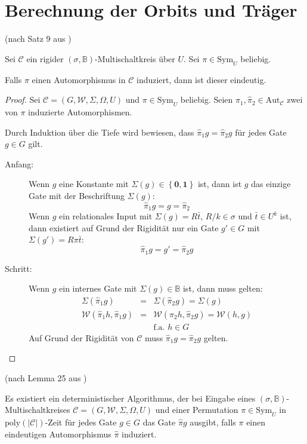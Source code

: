\section{Berechnung der Orbits und Träger}
\begin{prop}
\label{lem:rigide-eindeutig}(nach Satz 9 aus \cite{AD2014})

Sei $\mathcal{C}$ ein rigider $\left(\sigma,\mathbb{B}\right)$-Multischaltkreis
über $U$. Sei $\pi\in\mathrm{Sym}_{U}$ beliebig.

Falls $\pi$ einen Automorphismus in $\mathcal{C}$ induziert, dann
ist dieser eindeutig.
\end{prop}
\begin{proof}
Sei $\mathcal{C}=\left(G,\mathcal{W},\Sigma,\Omega,U\right)$ und
$\pi\in\mathrm{Sym}_{U}$ beliebig. Seien $\hat{\pi}_{1},\hat{\pi}_{2}\in\mathrm{Aut}_{\mathcal{C}}$
zwei von $\pi$ induzierte Automorphismen.

Durch Induktion über die Tiefe wird bewiesen, dass $\hat{\pi}_{1}g=\hat{\pi}_{2}g$
für jedes Gate $g\in G$ gilt.

\begin{description}
\item [{Anfang:}] Wenn $g$ eine Konstante mit $\Sigma\left(g\right)\in\left\{ \mathbf{0},\mathbf{1}\right\} $
ist, dann ist $g$ das einzige Gate mit der Beschriftung $\Sigma\left(g\right)$:
\[
\hat{\pi}_{1}g=g=\hat{\pi}_{2}
\]
Wenn $g$ ein relationales Input mit $\Sigma\left(g\right)=R\bar{t}$,
$R/k\in\sigma$ und $\bar{t}\in U^{k}$ ist, dann existiert auf Grund
der Rigidität nur ein Gate $g'\in G$ mit $\Sigma\left(g'\right)=R\pi\bar{t}$:
\[
\hat{\pi}_{1}g=g'=\hat{\pi}_{2}g
\]
\item [{Schritt:}] Wenn $g$ ein internes Gate mit $\Sigma\left(g\right)\in\mathbb{B}$
ist, dann muss gelten:
\begin{eqnarray*}
\Sigma\left(\hat{\pi}_{1}g\right) & = & \Sigma\left(\hat{\pi}_{2}g\right)=\Sigma\left(g\right)\\
\mathcal{W}\left(\hat{\pi}_{1}h,\hat{\pi}_{1}g\right) & = & \mathcal{W}\left(\hat{\pi}_{2}h,\hat{\pi}_{2}g\right)=\mathcal{W}\left(h,g\right)\\
 &  & \mathrm{f.a.}\,\,h\in G
\end{eqnarray*}
Auf Grund der Rigidität von $\mathcal{C}$ muss $\hat{\pi}_{1}g=\hat{\pi}_{2}g$
gelten.
\end{description}
\end{proof}
\begin{lem}
\label{lem:algo-auto}(nach Lemma 25 aus \cite{AD2014})

Es existiert ein deterministischer Algorithmus, der bei Eingabe eines
$\left(\sigma,\mathbb{B}\right)$-Multischaltkreises $\mathcal{C}=\left(G,\mathcal{W},\Sigma,\Omega,U\right)$
und einer Permutation $\pi\in\mathrm{Sym}_{U}$ in $\mathrm{poly}\left(\left|\mathcal{C}\right|\right)$-Zeit
für jedes Gate $g\in G$ das Gate $\hat{\pi}g$ ausgibt, falls $\pi$
einen eindeutigen Automorphismus $\hat{\pi}$ induziert.
\end{lem}

